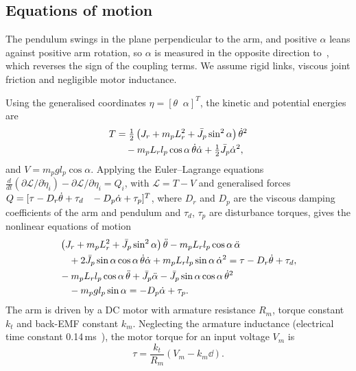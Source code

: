 \subsection{Equations of motion}
The pendulum swings in the plane perpendicular to the arm, and positive $\alpha$ leans against positive arm rotation, so $\alpha$ is measured in the opposite direction to~\cite{gafvert1998}, which reverses the sign of the coupling terms. We assume rigid links, viscous joint friction and negligible motor inductance.

Using the generalised coordinates $\eta=[\theta\;\;\alpha]^T$, the kinetic and potential energies are
\begin{align}
T &= \tfrac12\left(J_r+m_pL_r^2+\bar J_p\sin^2\alpha\right)\dot\theta^2 \nonumber\\
  &\quad - m_pL_rl_p\cos\alpha\,\dot\theta\dot\alpha + \tfrac12\bar J_p\dot\alpha^2,
\end{align}
and $V=m_pgl_p\cos\alpha$. Applying the Euler--Lagrange equations $\frac{d}{dt}(\partial\mathcal{L}/\partial\dot\eta_i)-\partial\mathcal{L}/\partial\eta_i=Q_i$, with $\mathcal{L}=T-V$ and generalised forces $Q=[\tau-D_r\dot\theta+\tau_d\;\;\;-D_p\dot\alpha+\tau_p]^T$, where $D_r$ and $D_p$ are the viscous damping coefficients of the arm and pendulum and $\tau_d$, $\tau_p$ are disturbance torques, gives the nonlinear equations of motion
\begin{align}
&\left(J_r + m_pL_r^2 + \bar J_p\sin^2\alpha\right)\ddot\theta - m_pL_rl_p\cos\alpha\,\ddot\alpha \nonumber\\
&\quad + 2\bar J_p\sin\alpha\cos\alpha\,\dot\theta\dot\alpha + m_pL_rl_p\sin\alpha\,\dot\alpha^2 = \tau - D_r\dot\theta + \tau_d, \label{eq:arm}\\
&-m_pL_rl_p\cos\alpha\,\ddot\theta + \bar J_p\ddot\alpha - \bar J_p\sin\alpha\cos\alpha\,\dot\theta^2 \nonumber\\
&\quad - m_pgl_p\sin\alpha = -D_p\dot\alpha + \tau_p. \label{eq:pend}
\end{align}
The arm is driven by a DC motor with armature resistance $R_m$, torque constant $k_t$ and back-EMF constant $k_m$. Neglecting the armature inductance (electrical time constant 0.14\,ms~\cite{allied}), the motor torque for an input voltage $V_m$ is
\begin{equation}
\tau = \frac{k_t}{R_m}\left(V_m - k_m\dd\right). \label{eq:motor}
\end{equation}

